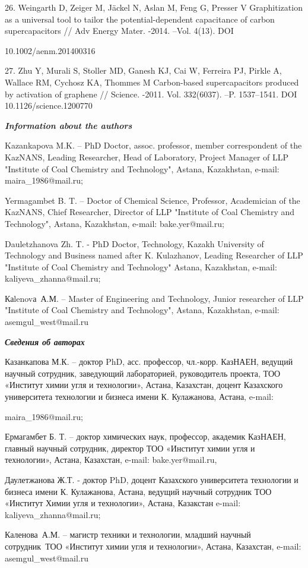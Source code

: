 \begin{noparindent}
26. Weingarth D, Zeiger M, Jäckel N, Aslan M, Feng G, Presser V
Graphitization as a universal tool to tailor the potential-dependent
capacitance of carbon supercapacitors // Adv Energy Mater. -2014. --Vol.
4(13). DOI

10.1002/aenm.201400316

27. Zhu Y, Murali S, Stoller MD, Ganesh KJ, Cai W, Ferreira PJ, Pirkle
A, Wallace RM, Cychosz KA, Thommes M Carbon-based supercapacitors
produced by activation of graphene // Science. -2011. Vol. 332(6037).
--P. 1537--1541. DOI 10.1126/science.1200770
\end{noparindent}

\emph{{\bfseries Information about the authors}}

\begin{noparindent}
Kazankapova M.K. -- PhD Doctor, assoc. professor, member correspondent
of the KazNANS, Leading Researcher, Head of Laboratory, Project Manager
of LLP "Institute of Coal Chemistry and Technology", Astana, Kazakhstan,
e-mail: maira\_1986@mail.ru;

Yermagambet B. T. -- Doctor of Chemical Science, Professor, Academician
of the KazNANS, Chief Researcher, Director of LLP "Institute of Coal
Chemistry and Technology", Astana, Kazakhstan, e-mail: bake.yer@mail.ru;

Dauletzhanova Zh. T. - PhD Doctor, Technology, Kazakh University of
Technology and Business named after K. Kulazhanov, Leading Researcher of
LLP "Institute of Coal Chemistry and Technology" Astana, Kazakhstan,
e-mail: kaliyeva\_zhanna@mail.ru;

Каlenovа~А.М. -- Master of Engineering and Technology, Junior researcher
of LLP "Institute of Coal Chemistry and Technology", Astana, Kazakhstan,
e-mail: asemgul\_west@mail.ru ~
\end{noparindent}

\emph{{\bfseries Сведения об авторах}}

\begin{noparindent}
Казанкапова М.К. -- доктор PhD, асс. профессор, чл.-корр. КазНАЕН,
ведущий научный сотрудник, заведующий лабораторией, руководитель
проекта, ТОО «Институт химии угля и технологии», Астана, Казахстан,
доцент Казахского университета технологии и бизнеса имени К. Кулажанова,
Астана, e-mail:

maira\_1986@mail.ru;

Ермагамбет Б. Т. -- доктор химических наук, профессор, академик КазНАЕН,
главный научный сотрудник, директор ТОО «Институт химии угля и
технологии», Астана, Казахстан, e-mail: bake.yer@mail.ru,

Даулетжанова Ж.Т. - доктор PhD, доцент Казахского университета
технологии и бизнеса имени К. Кулажанова, Астана, ведущий научный
сотрудник ТОО «Институт Химии угля и технологии», Астана, Казакстан
e-mail: kaliyeva\_zhanna@mail.ru;

Каленова~А.М. -- магистр техники и технологии, младший научный
сотрудник~ТОО «Институт химии угля и технологии», Астана, Казахстан,
e-mail: asemgul\_west@mail.ru
\end{noparindent}
